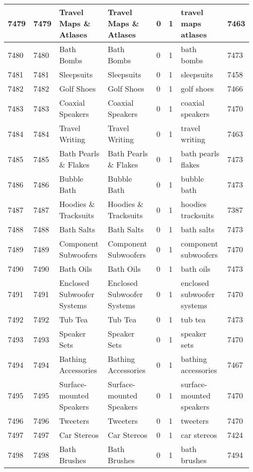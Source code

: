 \begin{longtable}{|l|l|l|l|l|l|l|l|}
7479 & 7479 & Travel Maps \& Atlases & Travel Maps \& Atlases & 0 & 1 & travel maps atlases & 7463 \\ \hline 
7480 & 7480 & Bath Bombs & Bath Bombs & 0 & 1 & bath bombs & 7473 \\ \hline 
7481 & 7481 & Sleepsuits & Sleepsuits & 0 & 1 & sleepsuits & 7458 \\ \hline 
7482 & 7482 & Golf Shoes & Golf Shoes & 0 & 1 & golf shoes & 7466 \\ \hline 
7483 & 7483 & Coaxial Speakers & Coaxial Speakers & 0 & 1 & coaxial speakers & 7470 \\ \hline 
7484 & 7484 & Travel Writing & Travel Writing & 0 & 1 & travel writing & 7463 \\ \hline 
7485 & 7485 & Bath Pearls \& Flakes & Bath Pearls \& Flakes & 0 & 1 & bath pearls flakes & 7473 \\ \hline 
7486 & 7486 & Bubble Bath & Bubble Bath & 0 & 1 & bubble bath & 7473 \\ \hline 
7487 & 7487 & Hoodies \& Tracksuits & Hoodies \& Tracksuits & 0 & 1 & hoodies tracksuits & 7387 \\ \hline 
7488 & 7488 & Bath Salts & Bath Salts & 0 & 1 & bath salts & 7473 \\ \hline 
7489 & 7489 & Component Subwoofers & Component Subwoofers & 0 & 1 & component subwoofers & 7470 \\ \hline 
7490 & 7490 & Bath Oils & Bath Oils & 0 & 1 & bath oils & 7473 \\ \hline 
7491 & 7491 & Enclosed Subwoofer Systems & Enclosed Subwoofer Systems & 0 & 1 & enclosed subwoofer systems & 7470 \\ \hline 
7492 & 7492 & Tub Tea & Tub Tea & 0 & 1 & tub tea & 7473 \\ \hline 
7493 & 7493 & Speaker Sets & Speaker Sets & 0 & 1 & speaker sets & 7470 \\ \hline 
7494 & 7494 & Bathing Accessories & Bathing Accessories & 0 & 1 & bathing accessories & 7467 \\ \hline 
7495 & 7495 & Surface-mounted Speakers & Surface-mounted Speakers & 0 & 1 & surface-mounted speakers & 7470 \\ \hline 
7496 & 7496 & Tweeters & Tweeters & 0 & 1 & tweeters & 7470 \\ \hline 
7497 & 7497 & Car Stereos & Car Stereos & 0 & 1 & car stereos & 7424 \\ \hline 
7498 & 7498 & Bath Brushes & Bath Brushes & 0 & 1 & bath brushes & 7494 \\ \hline 

\end{longtable}
